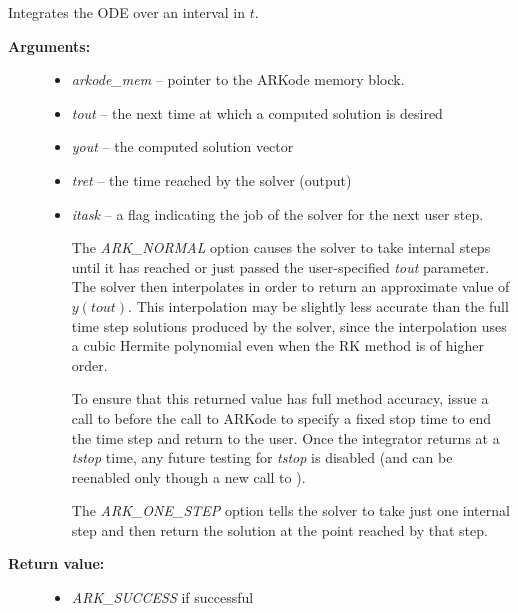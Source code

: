 \documentclass[letterpaper,10pt,english]{sphinxmanual}
\begin{document}
\begin{fulllineitems}
\label{c_interface/User_callable:ARKode}
Integrates the ODE over an interval in $t$.
\begin{description}
\item[{\textbf{Arguments:}}] \leavevmode\begin{itemize}
\item {} 
\emph{arkode\_mem} -- pointer to the ARKode memory block.

\item {} 
\emph{tout} -- the next time at which a computed solution is desired

\item {} 
\emph{yout} -- the computed solution vector

\item {} 
\emph{tret} -- the time reached by the solver (output)

\item {} 
\emph{itask} -- a flag indicating the job of the solver for the next
user step.

The \emph{ARK\_NORMAL} option causes the solver to take internal steps
until it has reached or just passed the user-specified \emph{tout}
parameter. The solver then interpolates in order to return an
approximate value of $y(tout)$.  This interpolation may be
slightly less accurate than the full time step solutions
produced by the solver, since the interpolation uses a cubic
Hermite polynomial even when the RK method is of higher order.

To ensure that this returned value has full method accuracy,
issue a call to {\hyperref[c_interface/User_callable:ARKodeSetStopTime]{}} before the call
to ARKode to specify a fixed stop time to end the time step
and return to the user.  Once the integrator returns at a
\emph{tstop} time, any future testing for \emph{tstop} is disabled (and
can be reenabled only though a new call to
{\hyperref[c_interface/User_callable:ARKodeSetStopTime]{}}).

The \emph{ARK\_ONE\_STEP} option tells the solver to take just one
internal step and then return the solution at the point
reached by that step.

\end{itemize}

\item[{\textbf{Return value:}}] \leavevmode\begin{itemize}
\item {} 
\emph{ARK\_SUCCESS} if successful


\end{itemize}
\end{description}
\end{fulllineitems}
\end{document}
